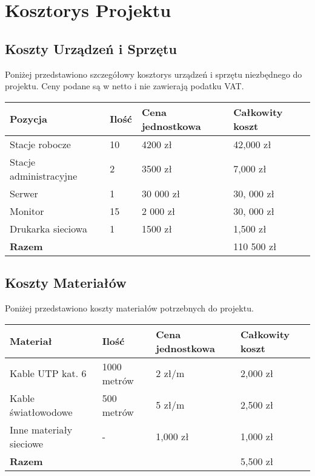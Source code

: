 \section{Kosztorys Projektu}

    \subsection{Koszty Urządzeń i Sprzętu}
        Poniżej przedstawiono szczegółowy kosztorys urządzeń i sprzętu niezbędnego do projektu. Ceny podane są w netto i nie zawierają podatku VAT.

        \begin{flushleft}
            \renewcommand{\arraystretch}{1.5}
            \begin{tabular}{|l|l|l|l|}
                \hline
                    \textbf{Pozycja} & \textbf{Ilość} & \textbf{Cena jednostkowa} & \textbf{Całkowity koszt} \\
                \hline
                Stacje robocze & 10 & 4200 zł & 42,000 zł \\
                Stacje administracyjne & 2 & 3500 zł & 7,000 zł \\
                Serwer & 1 & 30 000 zł & 30, 000 zł \\
                Monitor & 15 & 2 000 zł & 30, 000 zł \\
                Drukarka sieciowa & 1 & 1500 zł & 1,500 zł \\

                
                \hline
                    \textbf{Razem} & & & 110 500 zł \\
                \hline
            \end{tabular}
        \end{flushleft}

    \subsection{Koszty Materiałów}
        Poniżej przedstawiono koszty materiałów potrzebnych do projektu.

        \begin{flushleft}
            \renewcommand{\arraystretch}{1.5}
            \begin{tabular}{|l|l|l|l|}
                \hline
                    \textbf{Materiał} & \textbf{Ilość} & \textbf{Cena jednostkowa} & \textbf{Całkowity koszt} \\
                \hline
                    Kable UTP kat. 6 & 1000 metrów & 2 zł/m & 2,000 zł \\
                    Kable światłowodowe & 500 metrów & 5 zł/m & 2,500 zł \\
                    Inne materiały sieciowe & - & 1,000 zł & 1,000 zł \\
                \hline
                    \textbf{Razem} & & & 5,500 zł \\
                \hline
            \end{tabular}
        \end{flushleft}

